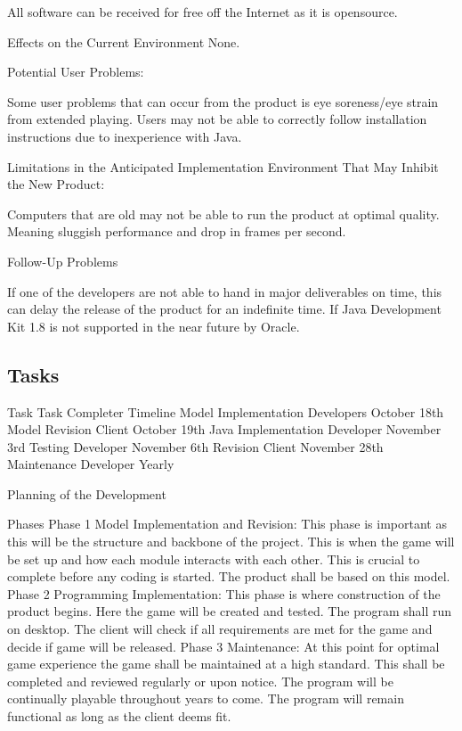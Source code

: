 \documentclass[12pt, titlepage]{article}
\begin{document}
All software can be received for free off the Internet as it is opensource.

Effects on the Current Environment 
None.

Potential User Problems:

Some user problems that can occur from the product is eye soreness/eye strain from extended playing. Users may not be able to correctly follow installation instructions due to inexperience with Java.

Limitations in the Anticipated Implementation Environment That May Inhibit the New Product:

Computers that are old may not be able to run the product at optimal quality. Meaning sluggish performance and drop in frames per second.

Follow-Up Problems 

If one of the developers are not able to hand in major deliverables on time, this can delay the release of the product for an indefinite time. If Java Development Kit 1.8 is not supported in the near future by Oracle.

\subsection{Tasks}

Task
Task Completer 
Timeline
Model Implementation
Developers
October 18th
Model Revision
Client
October 19th
Java Implementation
Developer
November 3rd
Testing
Developer
November 6th
Revision
Client
November 28th
Maintenance
Developer
Yearly

Planning of the Development 

Phases Phase 1 Model Implementation and Revision: This phase is important as this will be the structure and backbone of the project. This is when the game will be set up  and how each module interacts with each other. This is crucial to complete before any coding is started. The product shall be based on this model. Phase 2 Programming Implementation: This phase is where construction of the product begins. Here the game will be created and tested. The program shall run on desktop. The client will check if all requirements are met for the game and decide if game will be released. Phase 3 Maintenance: At this point for optimal game experience the game shall be maintained at a high standard. This shall be completed and reviewed regularly or upon notice. The program will be continually playable throughout years to come. The program will remain functional as long as the client deems fit. 
\end{document}
